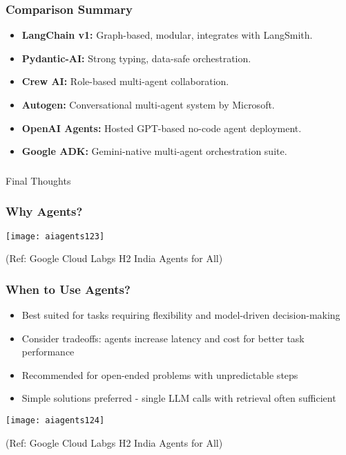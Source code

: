 \begin{frame}[fragile]\frametitle{Comparison Summary}
    \begin{itemize}
        \item \textbf{LangChain v1:} Graph-based, modular, integrates with LangSmith.
        \item \textbf{Pydantic-AI:} Strong typing, data-safe orchestration.
        \item \textbf{Crew AI:} Role-based multi-agent collaboration.
        \item \textbf{Autogen:} Conversational multi-agent system by Microsoft.
        \item \textbf{OpenAI Agents:} Hosted GPT-based no-code agent deployment.
        \item \textbf{Google ADK:} Gemini-native multi-agent orchestration suite.
    \end{itemize}
\end{frame}

\begin{frame}[fragile]\frametitle{}
\begin{center}
{\Large Final Thoughts}
\end{center}
\end{frame}

\begin{frame}[fragile]\frametitle{Why Agents?}
		\begin{center}
		\texttt{[image: aiagents123]}
		
		{\tiny (Ref: Google Cloud Labgs H2 India Agents for All)}
		\end{center}
\end{frame}



\begin{frame}[fragile]\frametitle{When to Use Agents?}
    \begin{itemize}
        \item Best suited for tasks requiring flexibility and model-driven decision-making
        \item Consider tradeoffs: agents increase latency and cost for better task performance
        \item Recommended for open-ended problems with unpredictable steps
        \item Simple solutions preferred - single LLM calls with retrieval often sufficient
    \end{itemize}
	
		\begin{center}
		\texttt{[image: aiagents124]}
		
		{\tiny (Ref: Google Cloud Labgs H2 India Agents for All)}
		\end{center}	
\end{frame}


